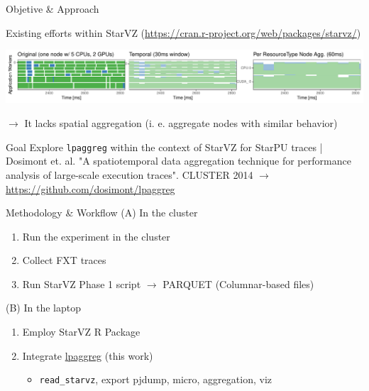 \documentclass[12pt,xcolor=dvipsnames,presentation,aspectratio=169]{beamer}
\begin{document}
{\begin{frame}[label={sec:org13ef2c3},fragile]{Objetive \& Approach}
\pause\vfill

Existing efforts within StarVZ (\url{https://cran.r-project.org/web/packages/starvz/})
\begin{center}
\includegraphics[width=.9\linewidth]{./agg_starvz.pdf}
\end{center}
\(\to\) It lacks spatial aggregation (i. e. aggregate nodes with similar behavior)

\pause\vfill
\begin{block}{Goal}
Explore \texttt{lpaggreg} within the context of StarVZ for StarPU traces |
Dosimont et. al. "A spatiotemporal data aggregation technique for
performance analysis of large-scale execution traces". CLUSTER 2014
\(\to\) \url{https://github.com/dosimont/lpaggreg}
\end{block}
\end{frame}
\begin{frame}[label={sec:orge965911},fragile]{Methodology \& Workflow}
 (A) In the cluster
\begin{enumerate}
\item Run the experiment in the cluster
\item Collect FXT traces
\item Run StarVZ Phase 1 script \(\to\) PARQUET (Columnar-based files)
\end{enumerate}

(B) In the laptop
\begin{enumerate}
\item Employ StarVZ R Package
\item Integrate \uline{lpaggreg} (this work)
\begin{itemize}
\item \texttt{read\_starvz}, export pjdump, micro, aggregation, viz
\end{itemize}
\end{enumerate}

\vfill\pause


\end{frame}}
\end{document}

